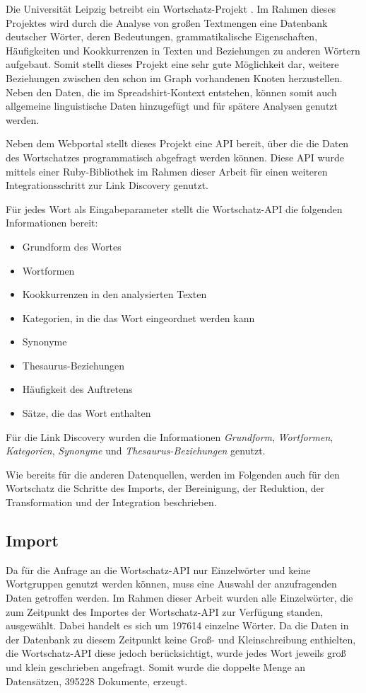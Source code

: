 Die Universität Leipzig betreibt ein Wortschatz-Projekt \cite{ws2013}. Im Rahmen dieses Projektes wird durch die Analyse von großen Textmengen eine Datenbank deutscher Wörter, deren Bedeutungen, grammatikalische Eigenschaften, Häufigkeiten und Kookkurrenzen in Texten und Beziehungen zu anderen Wörtern aufgebaut. Somit stellt dieses Projekt eine sehr gute Möglichkeit dar, weitere Beziehungen zwischen den schon im Graph vorhandenen Knoten herzustellen. Neben den Daten, die im Spreadshirt-Kontext entstehen, können somit auch allgemeine linguistische Daten hinzugefügt und für spätere Analysen genutzt werden.

Neben dem Webportal stellt dieses Projekt eine API bereit, über die die Daten des Wortschatzes programmatisch abgefragt werden können. Diese API wurde mittels einer Ruby-Bibliothek \cite{wlapi2013} im Rahmen dieser Arbeit für einen weiteren Integrationsschritt zur Link Discovery genutzt.

Für jedes Wort als Eingabeparameter stellt die Wortschatz-API die folgenden Informationen bereit:

\begin{itemize}
    \item Grundform des Wortes
    \item Wortformen
    \item Kookkurrenzen in den analysierten Texten
    \item Kategorien, in die das Wort eingeordnet werden kann
    \item Synonyme
    \item Thesaurus-Beziehungen
    \item Häufigkeit des Auftretens
    \item Sätze, die das Wort enthalten
\end{itemize}

Für die Link Discovery wurden die Informationen \emph{Grundform}, \emph{Wortformen}, \emph{Kategorien}, \emph{Synonyme} und \emph{Thesaurus-Beziehungen} genutzt.

Wie bereits für die anderen Datenquellen, werden im Folgenden auch für den Wortschatz die Schritte des Imports, der Bereinigung, der Reduktion, der Transformation und der Integration beschrieben.

\subsection{Import}

Da für die Anfrage an die Wortschatz-API nur Einzelwörter und keine Wortgruppen genutzt werden können, muss eine Auswahl der anzufragenden Daten getroffen werden. Im Rahmen dieser Arbeit wurden alle Einzelwörter, die zum Zeitpunkt des Importes der Wortschatz-API zur Verfügung standen, ausgewählt. Dabei handelt es sich um \num{197614} einzelne Wörter. Da die Daten in der Datenbank zu diesem Zeitpunkt keine Groß- und Kleinschreibung enthielten, die Wortschatz-API diese jedoch berücksichtigt, wurde jedes Wort jeweils groß und klein geschrieben angefragt. Somit wurde die doppelte Menge an Datensätzen, \num{395228} Dokumente, erzeugt.

